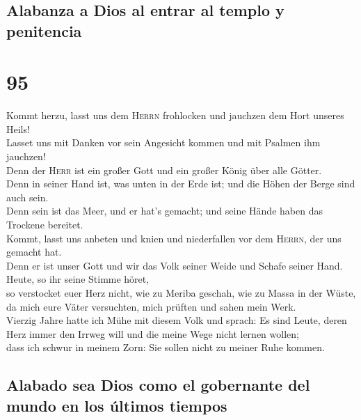 \hypertarget{alabanza-a-dios-al-entrar-al-templo-y-penitencia}{%
\subsection{Alabanza a Dios al entrar al templo y
penitencia}\label{alabanza-a-dios-al-entrar-al-templo-y-penitencia}}

\hypertarget{section-94}{%
\section{95}\label{section-94}}

 Kommt herzu, lasst uns dem \textsc{Herrn} frohlocken und
jauchzen dem Hort unseres Heils!\\
 Lasset uns mit Danken vor sein Angesicht kommen und mit
Psalmen ihm jauchzen!\\
 Denn der \textsc{Herr} ist ein großer Gott und ein großer
König über alle Götter.\\
 Denn in seiner Hand ist, was unten in der Erde ist; und
die Höhen der Berge sind auch sein.\\
 Denn sein ist das Meer, und er hat's gemacht; und seine
Hände haben das Trockene bereitet.\\
 Kommt, lasst uns anbeten und knien und niederfallen vor
dem \textsc{Herrn}, der uns gemacht hat.\\
 Denn er ist unser Gott und wir das Volk seiner Weide und
Schafe seiner Hand. Heute, so ihr seine Stimme höret,\\
 so verstocket euer Herz nicht, wie zu Meriba geschah, wie
zu Massa in der Wüste,\\
 da mich eure Väter versuchten, mich prüften und sahen
mein Werk.\\
 Vierzig Jahre hatte ich Mühe mit diesem Volk und sprach:
Es sind Leute, deren Herz immer den Irrweg will und die meine Wege nicht
lernen wollen;\\
 dass ich schwur in meinem Zorn: Sie sollen nicht zu
meiner Ruhe kommen.

\hypertarget{alabado-sea-dios-como-el-gobernante-del-mundo-en-los-uxfaltimos-tiempos}{%
\subsection{Alabado sea Dios como el gobernante del mundo en los últimos
tiempos}\label{alabado-sea-dios-como-el-gobernante-del-mundo-en-los-uxfaltimos-tiempos}}

